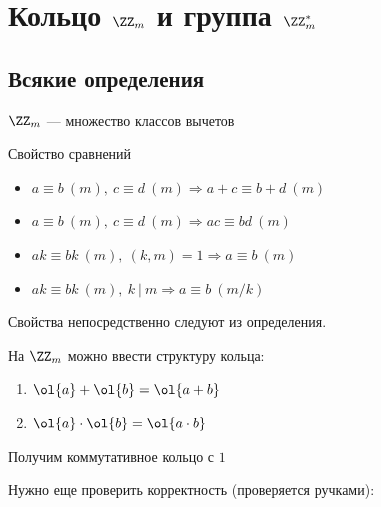 \newpage

\section{Кольцо \( \ZZ_m \) и группа \( \ZZ_m^* \)}

\subsection{Всякие определения}

\begin{defn}{}{}
    \( \ZZ_m \) --- множество классов вычетов
\end{defn}

\begin{lemma}{Свойство сравнений}{}
    \begin{itemize}
        \item
            \( a \equiv b \: (m), \: c \equiv d \: (m) \Rightarrow a + c \equiv b + d \: (m) \)
        \item
            \( a \equiv b \: (m), \: c \equiv d \: (m) \Rightarrow ac \equiv bd \: (m) \)
        \item
            \( ak \equiv bk \: (m), \: (k, m) = 1 \Rightarrow a \equiv b \: (m) \)
        \item
            \( ak \equiv bk \: (m), \: k \: | \: m \Rightarrow a \equiv b \: (m / k) \)
    \end{itemize}
\end{lemma}

Свойства непосредственно следуют из определения.

\begin{coroll}{}{}
    На \( \ZZ_m \) можно ввести структуру кольца:

    \begin{enumerate}
        \item
            \( \ol{a} + \ol{b} = \ol{a + b} \)
        \item
            \( \ol{a} \cdot \ol{b} = \ol{a \cdot b} \)
    \end{enumerate}

    Получим коммутативное кольцо с \( 1 \)
\end{coroll}

Нужно еще проверить корректность (проверяется ручками):

